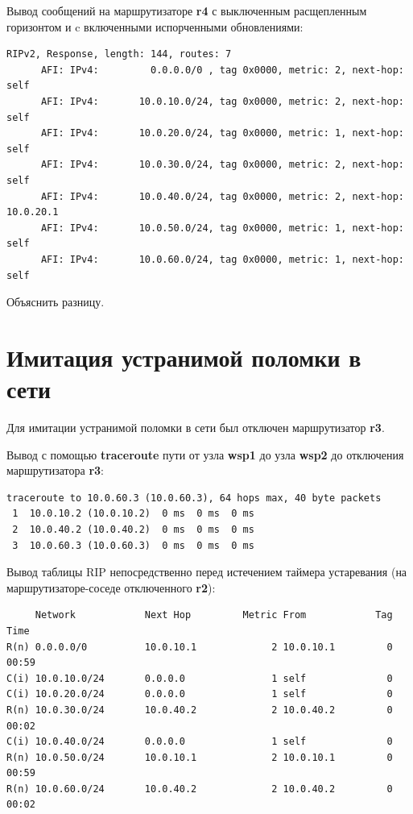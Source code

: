 \documentclass[a4paper,12pt]{article}
\begin{document}
Вывод сообщений на маршрутизаторе \textbf{r4} с выключенным расщепленным горизонтом и c включенными испорченными обновлениями:

\begin{Verbatim}
RIPv2, Response, length: 144, routes: 7
	  AFI: IPv4:         0.0.0.0/0 , tag 0x0000, metric: 2, next-hop: self
	  AFI: IPv4:       10.0.10.0/24, tag 0x0000, metric: 2, next-hop: self
	  AFI: IPv4:       10.0.20.0/24, tag 0x0000, metric: 1, next-hop: self
	  AFI: IPv4:       10.0.30.0/24, tag 0x0000, metric: 2, next-hop: self
	  AFI: IPv4:       10.0.40.0/24, tag 0x0000, metric: 2, next-hop: 10.0.20.1
	  AFI: IPv4:       10.0.50.0/24, tag 0x0000, metric: 1, next-hop: self
	  AFI: IPv4:       10.0.60.0/24, tag 0x0000, metric: 1, next-hop: self
\end{Verbatim}

Объяснить разницу.

\section{Имитация устранимой поломки в сети}

Для имитации устранимой поломки в сети был отключен маршрутизатор \textbf{r3}.

Вывод с помощью \textbf{traceroute} пути от узла \textbf{wsp1} до узла \textbf{wsp2} до отключения маршрутизатора \textbf{r3}:

\begin{Verbatim}
traceroute to 10.0.60.3 (10.0.60.3), 64 hops max, 40 byte packets
 1  10.0.10.2 (10.0.10.2)  0 ms  0 ms  0 ms
 2  10.0.40.2 (10.0.40.2)  0 ms  0 ms  0 ms
 3  10.0.60.3 (10.0.60.3)  0 ms  0 ms  0 ms
\end{Verbatim}

Вывод таблицы RIP непосредственно перед истечением таймера устаревания (на маршрутизаторе-соседе отключенного \textbf{r2}):

\begin{Verbatim}
     Network            Next Hop         Metric From            Tag Time
R(n) 0.0.0.0/0          10.0.10.1             2 10.0.10.1         0 00:59
C(i) 10.0.10.0/24       0.0.0.0               1 self              0
C(i) 10.0.20.0/24       0.0.0.0               1 self              0
R(n) 10.0.30.0/24       10.0.40.2             2 10.0.40.2         0 00:02
C(i) 10.0.40.0/24       0.0.0.0               1 self              0
R(n) 10.0.50.0/24       10.0.10.1             2 10.0.10.1         0 00:59
R(n) 10.0.60.0/24       10.0.40.2             2 10.0.40.2         0 00:02
\end{Verbatim}
\end{document}
